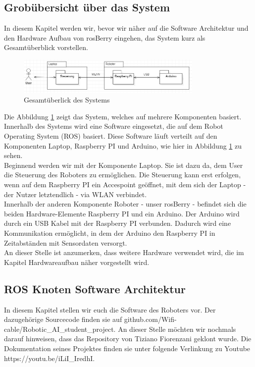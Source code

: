\documentclass[conference]{IEEEtran}
\begin{document}
	\subsection{Grobübersicht über das System}
	In diesem Kapitel werden wir, bevor wir näher auf die Software Architektur und den Hardware Aufbau von rosBerry eingehen, das System kurz als Gesamtüberblick vorstellen.
	
	\begin{figure}[!ht]
    \centering
    \includegraphics[width=9cm]{img/Gesamtsystem.PNG}
    \caption{Gesamtüberlick des Systems}
    \label{Gesamtüberblick}
    \end{figure}
	
	Die Abbildung \ref{Gesamtüberblick} zeigt das System, welches auf mehrere Komponenten basiert. Innerhalb des Systems wird eine Software eingesetzt, die auf dem Robot Operating System (ROS) basiert. Diese Software läuft verteilt auf den Komponenten Laptop, Raspberry PI und Arduino, wie hier in Abbildung \ref{Gesamtüberblick} zu sehen. \\
	Beginnend werden wir mit der Komponente Laptop. Sie ist dazu da, dem User die Steuerung des Roboters zu ermöglichen. Die Steuerung kann erst erfolgen, wenn auf dem Raspberry PI ein Accespoint geöffnet, mit dem sich der Laptop - der Nutzer letztendlich - via WLAN verbindet.\\
	Innerhalb der anderen Komponente Roboter - unser rosBerry - befindet sich die beiden Hardware-Elemente Raspberry PI und ein Arduino. Der Arduino wird durch ein USB Kabel mit der Raspberry PI verbunden. Dadurch wird eine Kommunikation ermöglicht, in dem der Arduino den Raspberry PI in Zeitabständen mit Sensordaten versorgt.\\
	An dieser Stelle ist anzumerken, dass weitere Hardware verwendet wird, die im Kapitel Hardwareaufbau näher vorgestellt wird.
	
	\subsection{ROS Knoten Software Architektur}%
	In diesem Kapitel stellen wir euch die Software des Roboters vor. Der dazugehörige Sourcecode finden sie auf github.com/Wifi-cable/Robotic\_AI\_student\_project. An dieser Stelle möchten wir nochmals darauf hinweisen, dass das Repository von Tiziano Fiorenzani geklont wurde. Die Dokumentation seines Projektes finden sie unter folgende Verlinkung zu Youtube https://youtu.be/iLiI\_IredhI.
	
\end{document}
